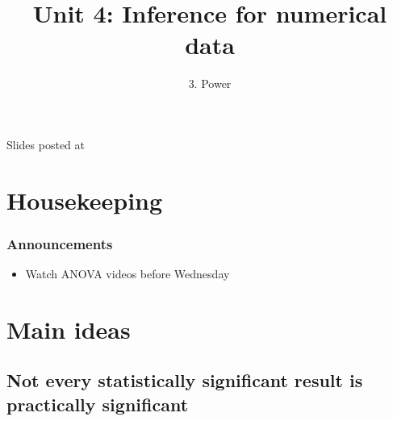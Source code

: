 \documentclass[slidestop,compress,mathserif,12pt,t,professionalfonts,xcolor=table]{beamer}
\title{Unit 4: Inference for numerical data}
\subtitle{3. Power}
\author{\CourseName}
\date{}
\institute{\InstituteName}
\begin{document}



\begin{frame}[plain]

\titlepage

\vfill

{\scriptsize {} \hfill Slides posted at  \webURL{\CourseSite}}

\addtocounter{framenumber}{-1} 

\end{frame}


\section{Housekeeping}


\begin{frame}
\frametitle{Announcements}

\begin{itemize}

\item Watch ANOVA videos before Wednesday

\end{itemize}

\end{frame}


\section{Main ideas}

%


\subsection{Not every statistically significant result is practically significant}
\label{mi1}
\end{document}
